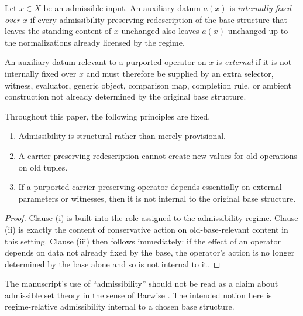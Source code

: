 \begin{definition}
Let $x\in X$ be an admissible input. An auxiliary datum $a(x)$ is \emph{internally fixed over $x$} if every admissibility-preserving redescription of the base structure that leaves the standing content of $x$ unchanged also leaves $a(x)$ unchanged up to the normalizations already licensed by the regime.
\end{definition}

\begin{definition}
An auxiliary datum relevant to a purported operator on $x$ is \emph{external} if it is not internally fixed over $x$ and must therefore be supplied by an extra selector, witness, evaluator, generic object, comparison map, completion rule, or ambient construction not already determined by the original base structure.
\end{definition}

\begin{proposition}\label{prop:firewall}
Throughout this paper, the following principles are fixed.
\begin{enumerate}[label=(\roman*)]
    \item Admissibility is structural rather than merely provisional.
    \item A carrier-preserving redescription cannot create new values for old operations on old tuples.
    \item If a purported carrier-preserving operator depends essentially on external parameters or witnesses, then it is not internal to the original base structure.
\end{enumerate}
\end{proposition}

\begin{proof}
Clause (i) is built into the role assigned to the admissibility regime. Clause (ii) is exactly the content of conservative action on old-base-relevant content in this setting. Clause (iii) then follows immediately: if the effect of an operator depends on data not already fixed by the base, the operator's action is no longer determined by the base alone and so is not internal to it.
\end{proof}

\begin{remark}
The manuscript's use of ``admissibility'' should not be read as a claim about admissible set theory in the sense of Barwise \citep{Barwise1975}. The intended notion here is regime-relative admissibility internal to a chosen base structure.
\end{remark}
